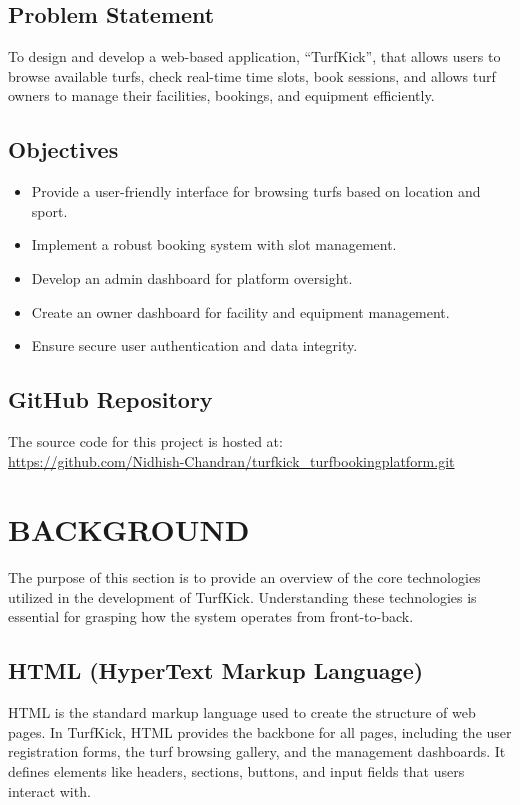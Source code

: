 \documentclass[12pt]{report}
\begin{document}
\section{Problem Statement}
To design and develop a web-based application, ``TurfKick'', that allows users to browse available turfs, check real-time time slots, book sessions, and allows turf owners to manage their facilities, bookings, and equipment efficiently.

\section{Objectives}
\begin{itemize}
    \item Provide a user-friendly interface for browsing turfs based on location and sport.
    \item Implement a robust booking system with slot management.
    \item Develop an admin dashboard for platform oversight.
    \item Create an owner dashboard for facility and equipment management.
    \item Ensure secure user authentication and data integrity.
\end{itemize}

\section{GitHub Repository}
The source code for this project is hosted at: \\
\url{https://github.com/Nidhish-Chandran/turfkick_turfbookingplatform.git}

\chapter{BACKGROUND}
\label{chap:background}

The purpose of this section is to provide an overview of the core technologies utilized in the development of TurfKick. Understanding these technologies is essential for grasping how the system operates from front-to-back.

\section{HTML (HyperText Markup Language)}
HTML is the standard markup language used to create the structure of web pages. In TurfKick, HTML provides the backbone for all pages, including the user registration forms, the turf browsing gallery, and the management dashboards. It defines elements like headers, sections, buttons, and input fields that users interact with.
\end{document}
